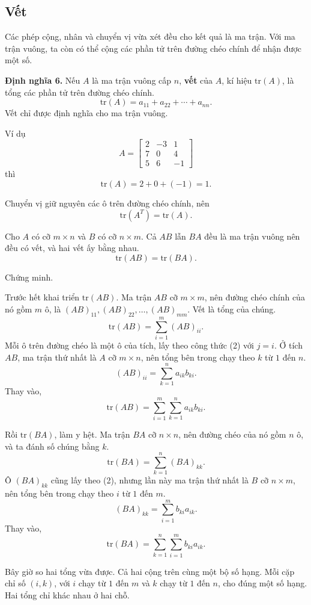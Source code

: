 \documentclass[12pt,a4paper]{article}
\begin{document}
\subsection{Vết}

Các phép cộng, nhân và chuyển vị vừa xét đều cho kết quả là ma trận. Với ma trận vuông, ta còn có thể cộng các phần tử trên đường chéo chính để nhận được một số.

\textbf{Định nghĩa 6.} Nếu \(A\) là ma trận vuông cấp \(n\), \textbf{vết} của \(A\), kí hiệu \(\mathrm{tr}(A)\), là tổng các phần tử trên đường chéo chính.
$$
\mathrm{tr}(A)=a_{11}+a_{22}+\cdots+a_{nn}.
$$
Vết chỉ được định nghĩa cho ma trận vuông.

Ví dụ
$$
A=\left[ \begin{array}{rrr} 2 & -3 & 1\\ 7 & 0 & 4\\ 5 & 6 & -1 \end{array} \right]
$$
thì
$$
\mathrm{tr}(A)=2+0+(-1)=1.
$$

Chuyển vị giữ nguyên các ô trên đường chéo chính, nên
$$
\mathrm{tr}(A^T)=\mathrm{tr}(A).
$$

Cho \(A\) có cỡ \(m\times n\) và \(B\) có cỡ \(n\times m\). Cả \(AB\) lẫn \(BA\) đều là ma trận vuông nên đều có vết, và hai vết ấy bằng nhau.
$$
\mathrm{tr}(AB)=\mathrm{tr}(BA). \tag{10}
$$

Chứng minh.

Trước hết khai triển \(\mathrm{tr}(AB)\). Ma trận \(AB\) cỡ \(m\times m\), nên đường chéo chính của nó gồm \(m\) ô, là \((AB)_{11},(AB)_{22},\ldots,(AB)_{mm}\). Vết là tổng của chúng.
$$
\mathrm{tr}(AB)=\sum_{i=1}^{m}(AB)_{ii}.
$$
Mỗi ô trên đường chéo là một ô của tích, lấy theo công thức (2) với \(j=i\). Ở tích \(AB\), ma trận thứ nhất là \(A\) cỡ \(m\times n\), nên tổng bên trong chạy theo \(k\) từ \(1\) đến \(n\).
$$
(AB)_{ii}=\sum_{k=1}^{n}a_{ik}b_{ki}.
$$
Thay vào,
$$
\mathrm{tr}(AB)=\sum_{i=1}^{m}\sum_{k=1}^{n}a_{ik}b_{ki}.
$$

Rồi \(\mathrm{tr}(BA)\), làm y hệt. Ma trận \(BA\) cỡ \(n\times n\), nên đường chéo của nó gồm \(n\) ô, và ta đánh số chúng bằng \(k\).
$$
\mathrm{tr}(BA)=\sum_{k=1}^{n}(BA)_{kk}.
$$
Ô \((BA)_{kk}\) cũng lấy theo (2), nhưng lần này ma trận thứ nhất là \(B\) cỡ \(n\times m\), nên tổng bên trong chạy theo \(i\) từ \(1\) đến \(m\).
$$
(BA)_{kk}=\sum_{i=1}^{m}b_{ki}a_{ik}.
$$
Thay vào,
$$
\mathrm{tr}(BA)=\sum_{k=1}^{n}\sum_{i=1}^{m}b_{ki}a_{ik}.
$$

Bây giờ so hai tổng vừa được. Cả hai cộng trên cùng một bộ số hạng. Mỗi cặp chỉ số \((i,k)\), với \(i\) chạy từ \(1\) đến \(m\) và \(k\) chạy từ \(1\) đến \(n\), cho đúng một số hạng. Hai tổng chỉ khác nhau ở hai chỗ.
\end{document}
